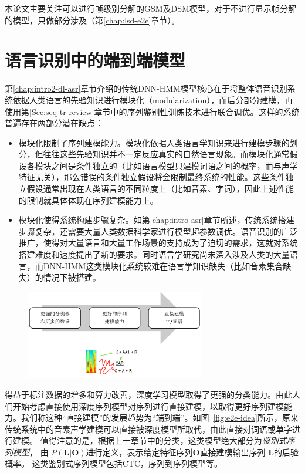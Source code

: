 本论文主要关注可以进行帧级别分解的GSM及DSM模型，对于不进行显示帧分解的模型，只做部分涉及（第\ref{chap:lsd-e2e}章节）。

\section{语言识别中的端到端模型}
\label{chap:intro2-e2e}

第\ref{chap:intro2-dl-asr}章节介绍的传统DNN-HMM模型核心在于将整体语音识别系统依据人类语言的先验知识进行模块化（modularization），而后分部分建模，再使用第\ref{Sec:seq-tr-review}章节中的序列鉴别性训练技术进行联合调优。这样的系统普遍存在两部分潜在缺点：
\begin{itemize}
    \item 模块化限制了序列建模能力。模块化依据人类语言学知识来进行建模步骤的划分，但往往这些先验知识并不一定反应真实的自然语言现象。而模块化通常假设各模块之间是条件独立的（比如语言模型只建模词语之间的概率，而与声学特征无关），那么错误的条件独立假设将会限制最终系统的性能。这些条件独立假设通常出现在人类语言的不同粒度上（比如音素、字词），因此上述性能的限制就具体体现在序列建模能力上。
    \item 模块化使得系统构建步骤复杂。如第\ref{chap:intro-asr}章节所述，传统系统搭建步骤复杂，还需要大量人类数据科学家进行模型超参数调优。语音识别的广泛推广，使得对大量语言和大量工作场景的支持成为了迫切的需求，这就对系统搭建难度和速度提出了新的要求。同时语言学研究尚未深入涉及人类的大量语言，而DNN-HMM这类模块化系统较难在语言学知识缺失（比如音素集合缺失）的情况下被搭建。
\end{itemize}

\begin{figure}[!htp]
  \centering
    \captionstyle{\centering}
    \includegraphics[clip=true, width=0.7\textwidth]{figure/e2e-idea.png}
\end{figure}


得益于标注数据的增多和算力改善，深度学习模型取得了更强的分类能力。由此人们开始考虑直接使用深度序列模型对序列进行直接建模，以取得更好序列建模能力。我们称这种“直接建模”的发展趋势为“端到端”。如图~\ref{fig:e2e-idea}所示，原来传统系统中的音素声学建模可以直接被深度模型所取代，由此直接对词语或单字进行建模。
值得注意的是，根据上一章节中的分类，这类模型绝大部分为{\em 鉴别式序列模型}， 由 $P(\mathbf{L}|\mathbf{O})$进行定义，表示给定特征序列$\mathbf{O}$直接建模输出序列 $\mathbf{L}$的后验概率。
这类鉴别式序列模型包括CTC，序列到序列模型等。

